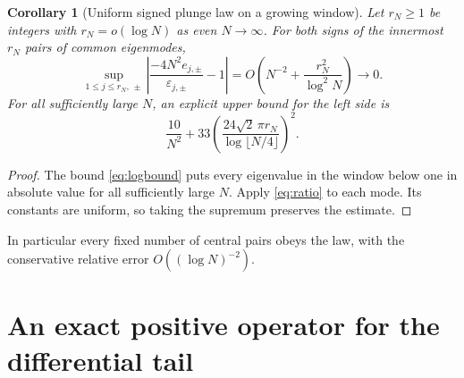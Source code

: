 \documentclass[10pt]{article}
\newtheorem{corollary}[theorem]{Corollary}
\begin{document}
\begin{corollary}[Uniform signed plunge law on a growing window]
Let $r_N\ge1$ be integers with $r_N=o(\log N)$ as even $N\to\infty$.
For both signs of the innermost $r_N$ pairs of common eigenmodes,
\begin{equation}
\sup_{1\le j\le r_N,\,\pm}
\left|\frac{-4N^2 e_{j,\pm}}{\varepsilon_{j,\pm}}-1\right|
=O\!\left(N^{-2}+\frac{r_N^2}{\log^2 N}\right)\longrightarrow0.
\label{eq:windowlaw}
\end{equation}
For all sufficiently large $N$, an explicit upper bound for the left
side is
\[
\frac{10}{N^2}+33\left(
\frac{24\sqrt2\,\pi r_N}{\log\lfloor N/4\rfloor}\right)^2.
\]
\end{corollary}
\begin{proof}
The bound \eqref{eq:logbound} puts every eigenvalue in the window below one
in absolute value for all sufficiently large $N$. Apply
\eqref{eq:ratio} to each mode. Its constants are uniform, so taking
the supremum preserves the estimate.
\end{proof}
In particular every fixed number of central pairs obeys the law, with
the conservative relative error $O((\log N)^{-2})$.

\section{An exact positive operator for the differential tail}
\end{document}
